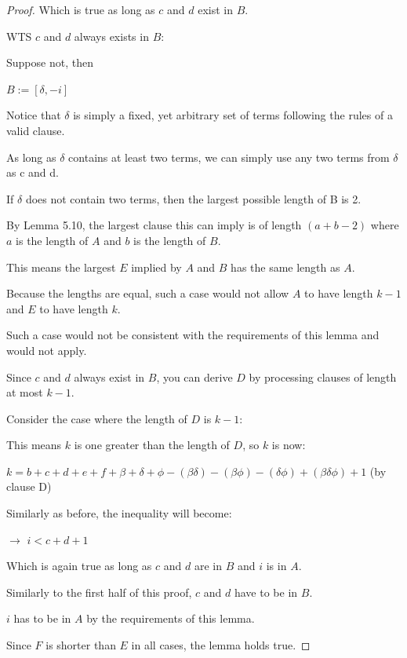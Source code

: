 \documentclass[manuscript]{acmart}
\begin{document}
\begin{proof}
        Which is true as long as $c$ and $d$ exist in $B$.

        WTS $c$ and $d$ always exists in $B$:

        Suppose not, then 

        $B := [\delta, -i]$

        Notice that $\delta$ is simply a fixed, yet arbitrary set of terms
        following the rules of a valid clause.

        As long as $\delta$ contains at least two terms, we can simply use 
        any two terms from $\delta$ as c and d.

        If $\delta$ does not contain two terms, then the largest possible
        length of B is 2.
        
        By Lemma 5.10, the largest clause this can imply is of length 
        $(a + b - 2)$ where $a$ is the length of $A$ and $b$ is the length 
        of $B$.

        This means the largest $E$ implied by $A$ and $B$ has the same 
        length as $A$.

        Because the lengths are equal, such a case would not allow $A$ to 
        have length $k - 1$ and $E$ to have length $k$.

        Such a case would not be consistent with the requirements of this 
        lemma and would not apply.

        Since $c$ and $d$ always exist in $B$, you can derive $D$ by processing
        clauses of length at most $k-1$.
    

        Consider the case where the length of $D$ is $k - 1$:

        This means $k$ is one greater than the length of $D$, so $k$ is now:

        $k = b + c + d + e + f + \beta + \delta + \phi - (\beta \delta) - 
        (\beta \phi) - (\delta \phi) + (\beta \delta \phi) + 1$ (by clause D)

        Similarly as before, the inequality will become:

        $\rightarrow$ $i < c + d + 1$

        Which is again true as long as $c$ and $d$ are in $B$ and $i$ is in $A$.

        Similarly to the first half of this proof, $c$ and $d$ have to be in
        $B$.

        $i$ has to be in $A$ by the requirements of this lemma.

        Since $F$ is shorter than $E$ in all cases, the lemma holds true.
    \end{proof}
\end{document}
